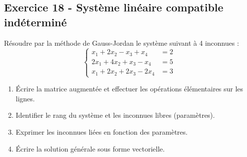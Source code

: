 \documentclass[12pt,a4paper]{article}
\begin{document}
\subsection*{Exercice 18 - Système linéaire compatible indéterminé \niveau{\moyen}}
\newpage
\begin{boiteexercice}
Résoudre par la méthode de Gauss-Jordan le système suivant à 4 inconnues :
\[
\left\{\begin{aligned}
x_1 + 2x_2 - x_3 + x_4 &= 2 \\
2x_1 + 4x_2 + x_3 - x_4 &= 5 \\
x_1 + 2x_2 + 2x_3 - 2x_4 &= 3
\end{aligned}\right.
\]

\begin{enumerate}
  \item Écrire la matrice augmentée et effectuer les opérations élémentaires sur les lignes.
  \item Identifier le rang du système et les inconnues libres (paramètres).
  \item Exprimer les inconnues liées en fonction des paramètres.
  \item Écrire la solution générale sous forme vectorielle.
\end{enumerate}
\end{boiteexercice}
\end{document}
